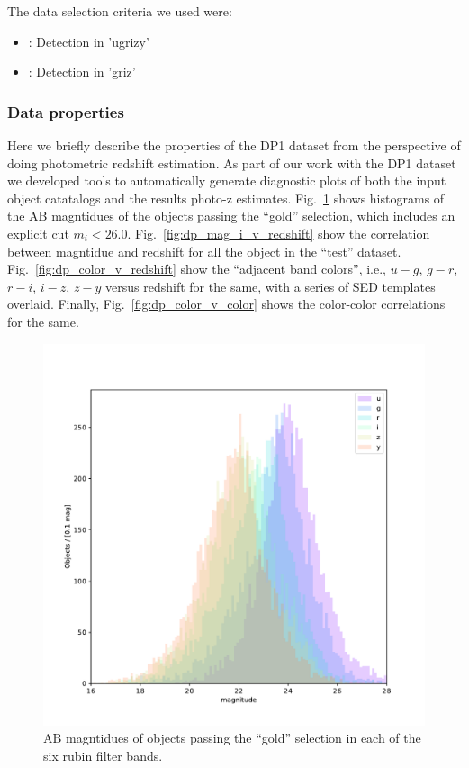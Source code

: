 The data selection criteria we used were:
\begin{itemize}
\item{: Detection in 'ugrizy' }
\item{: Detection in 'griz' }
\end{itemize}


\subsubsection{Data properties}
\label{sec:data:dp1:properties}

Here we briefly describe the properties of the DP1 dataset from the perspective of doing photometric redshift estimation.   As part of our work with the DP1 dataset we developed tools to automatically generate diagnostic plots of both the input object catatalogs and the results photo-z estimates.
Fig.~\ref{fig:dp_mags} shows histograms of the AB magntidues of the objects passing the ``gold'' selection,  which includes an explicit cut $m_{i} < 26.0$.   Fig.~\ref{fig:dp_mag_i_v_redshift} show the correlation between magntidue and redshift for all the object in the ``test'' dataset.   Fig.~\ref{fig:dp_color_v_redshift} show the ``adjacent band colors'', i.e., $u-g$, $g-r$, $r-i$, $i-z$, $z-y$ versus redshift for the same, with a series of SED templates overlaid.  Finally, Fig.~\ref{fig:dp_color_v_color} shows the color-color correlations for the same.

\begin{figure}
    \centering
    \includegraphics[width=\linewidth]{figures/mags.pdf}
    \caption{AB magntidues of objects passing the ``gold'' selection in each of the six rubin filter bands.} 
    \label{fig:dp_mags}
\end{figure}

